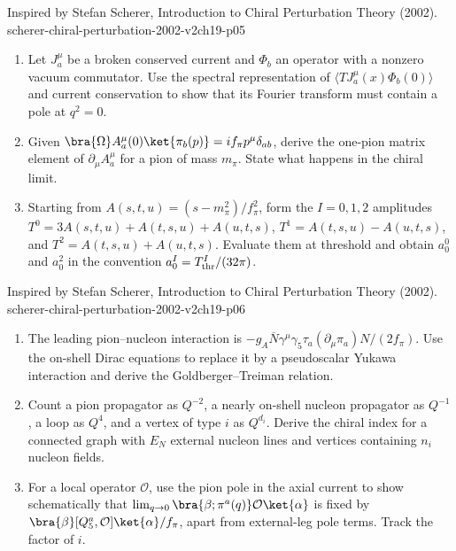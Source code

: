 \begin{enumerate}
  {Inspired by Stefan Scherer, Introduction to Chiral Perturbation Theory (2002).}
  {scherer-chiral-perturbation-2002-v2ch19-p05}
  \begin{enumerate}
    \item[(a)]
    Let \(J^\mu_a\) be a broken conserved current and \(\Phi_b\) an operator
    with a nonzero vacuum commutator.  Use the spectral representation of
    \(\langle T J^\mu_a(x)\Phi_b(0)\rangle\) and current conservation to
    show that its Fourier transform must contain a pole at \(q^2=0\).
    \item[(b)]
    Given
    \(\bra{\Omega}A^\mu_a(0)\ket{\pi_b(p)}
      =if_\pi p^\mu\delta_{ab}\),
    derive the one-pion matrix element of \(\partial_\mu A^\mu_a\) for a
    pion of mass \(m_\pi\).  State what happens in the chiral limit.
    \item[(c)]
    Starting from
    \(A(s,t,u)=(s-m_\pi^2)/f_\pi^2\), form the \(I=0,1,2\)
    amplitudes
    \(T^0=3A(s,t,u)+A(t,s,u)+A(u,t,s)\),
    \(T^1=A(t,s,u)-A(u,t,s)\), and
    \(T^2=A(t,s,u)+A(u,t,s)\).
    Evaluate them at threshold and obtain \(a_0^0\) and \(a_0^2\) in the
    convention \(a_0^I=T^I_{\rm thr}/(32\pi)\).
  \end{enumerate}

  {Inspired by Stefan Scherer, Introduction to Chiral Perturbation Theory (2002).}
  {scherer-chiral-perturbation-2002-v2ch19-p06}
  \begin{enumerate}
    \item[(a)]
    The leading pion--nucleon interaction is
    \(-g_A\overline N\gamma^\mu\gamma_5\tau_a
    (\partial_\mu\pi_a)N/(2f_\pi)\).
    Use the on-shell Dirac equations to replace it by a pseudoscalar
    Yukawa interaction and derive the Goldberger--Treiman relation.
    \item[(b)]
    Count a pion propagator as \(Q^{-2}\), a nearly on-shell nucleon
    propagator as \(Q^{-1}\), a loop as \(Q^4\), and a vertex of type \(i\)
    as \(Q^{d_i}\).  Derive the chiral index for a connected graph with
    \(E_N\) external nucleon lines and vertices containing \(n_i\) nucleon
    fields.
    \item[(c)]
    For a local operator \(\mathcal O\), use the pion pole in the axial
    current to show schematically that
    \(\lim_{q\to0}\bra{\beta;\pi^a(q)}\mathcal O\ket{\alpha}\)
    is fixed by \(\bra{\beta}[Q_5^a,\mathcal O]\ket{\alpha}/f_\pi\),
    apart from external-leg pole terms.  Track the factor of \(i\).
  \end{enumerate}


\end{enumerate}
